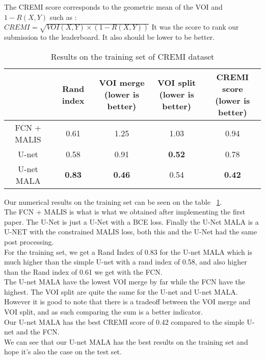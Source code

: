 The CREMI score corresponds to the geometric mean of the VOI and $1-R(X,Y)$ such as :\\
$CREMI = \sqrt{VOI(X,Y)\times (1 - R(X,Y))}$
It was the score to rank our submission to the leaderboard. It also should be lower to be better.\\

\begin{table}[!htbp]
	\centering
	\begin{tabular}{|c|c|c|c|c|}
		\hline
		& Rand index & \thead{VOI merge \\(lower is better)} & \thead{VOI split\\(lower is better)} & \thead{CREMI score\\(lower is better)}\\
		\hline
		FCN + MALIS & 0.61 & 1.25 & 1.03 & 0.94\\
		\hline
		U-net & 0.58 & 0.91 & \textbf{0.52} & 0.78\\
		\hline
		U-net MALA & \textbf{0.83} & \textbf{0.46} & 0.54 & \textbf{0.42}\\
		\hline
	\end{tabular}
	\caption{Results on the training set of CREMI dataset}
\label{tab:cremi_res_train}
\end{table}

Our numerical results on the training set can be seen on the table ~\ref{tab:cremi_res_train}.\\
The FCN + MALIS is what is what we obtained after implementing the first paper.
The U-Net is just a U-Net with a BCE loss.
Finally the U-Net MALA is a U-NET with the constrained MALIS loss, both this and the U-Net had the same post processing.\\

For the training set, we get a Rand Index of 0.83 for the U-net MALA which is much higher than the simple U-net with a rand index of 0.58, and also higher than the Rand index of 0.61 we get with the FCN.\\
The U-net MALA have the lowest VOI merge by far while the FCN have the highest. The VOI split are quite the same for the U-net and U-net MALA.\\
However it is good to note that there is a tradeoff between the VOI merge and VOI split, and as such comparing the sum is a better indicator.\\
Our U-net MALA has the best CREMI score of 0.42 compared to the simple U-net and the FCN.\\ 
We can see that our U-net MALA has the best results on the training set and hope it’s also the case on the test set.\\

